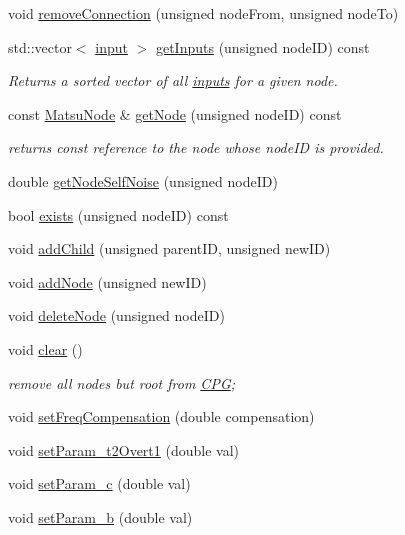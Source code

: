 \begin{DoxyCompactItemize}
void \hyperlink{classCPG_ab2c84c91fc9de378a6ed0a29305244cc}{remove\+Connection} (unsigned node\+From, unsigned node\+To)
\item 
std\+::vector$<$ \hyperlink{structCPG_1_1input}{input} $>$ \hyperlink{classCPG_ad79b39c4d59f70fb567b86d9655d96fc}{get\+Inputs} (unsigned node\+ID) const 
\begin{DoxyCompactList}\small\item\em Returns a sorted vector of all \hyperlink{structCPG_1_1input}{inputs} for a given node. \end{DoxyCompactList}\item 
const \hyperlink{classMatsuNode}{Matsu\+Node} \& \hyperlink{classCPG_a663cc03b61df7f061c96560ed614b3ae}{get\+Node} (unsigned node\+ID) const 
\begin{DoxyCompactList}\small\item\em returns const reference to the node whose node\+ID is provided. \end{DoxyCompactList}\item 
double \hyperlink{classCPG_ad3ddf0fa097221f855e5f52fc6ec01bc}{get\+Node\+Self\+Noise} (unsigned node\+ID)
\item 
bool \hyperlink{classCPG_a7477f1c89fe011fa1b14c5e1f2598472}{exists} (unsigned node\+ID) const 
\item 
void \hyperlink{classCPG_a1a182a410afd8e3b76cb16d99ddef541}{add\+Child} (unsigned parent\+ID, unsigned new\+ID)
\item 
void \hyperlink{classCPG_ab46ba41b0e4156194c8eb1561ef5c9a3}{add\+Node} (unsigned new\+ID)
\item 
void \hyperlink{classCPG_a4926078d71fc86b7cec29faa43b16d8e}{delete\+Node} (unsigned node\+ID)
\item 
void \hyperlink{classCPG_a7b9beb05a9681c34d99509018dda8739}{clear} ()
\begin{DoxyCompactList}\small\item\em remove all nodes but root from \hyperlink{classCPG}{C\+PG}; \end{DoxyCompactList}\item 
void \hyperlink{classCPG_a6a7d9249a73865d230b9f0308965705e}{set\+Freq\+Compensation} (double compensation)
\item 
void \hyperlink{classCPG_a67c0d2d6de22109fe467f4e05c0a37b9}{set\+Param\+\_\+t2\+Overt1} (double val)
\item 
void \hyperlink{classCPG_a21e3d9ae738df133b65efbc4ad4bb51a}{set\+Param\+\_\+c} (double val)
\item 
void \hyperlink{classCPG_a7da2207c51449752c5fcaf242f2a01e9}{set\+Param\+\_\+b} (double val)

\end{DoxyCompactItemize}
